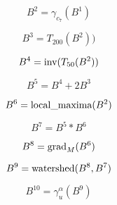\documentclass[\main/main.tex]{subfiles}
\begin{document}
\begin{equation}
    \label{eq:larva:open_1}
    B^2= \gamma_{c_7}(B^1)
\end{equation}

\begin{equation}
    \label{eq:larva:thresh:high}
    B^3= T_{200}(B^2))
\end{equation}

\begin{equation}
    \label{eq:larva:thresh:low}
    B^4= \operatorname{\textnormal{inv}}(T_{50}(B^2))
\end{equation}

\begin{equation}
    \label{eq:larva:zones}
    B^5= B^4 + 2B^3
\end{equation}

\begin{equation}
    \label{eq:larva:max_loc}
    B^6 = \operatorname{\textnormal{local\_maxima}}(B^2)
\end{equation}

\begin{equation}
    \label{eq:larva:seeds}
    B^7= B^5 * B^6
\end{equation}

\begin{equation}
    \label{eq:larva:grad}
    B^8= \operatorname{\textnormal{grad}}_M(B^6)
\end{equation}

\begin{equation}
    \label{eq:larva:water}
    B^9= \operatorname{\textnormal{watershed}}(B^8,B^7)
\end{equation}

\begin{equation}
    \label{eq:larva:down:water}
    B^{10}= \gamma^{\alpha}_{u}(B^9)
\end{equation}
\end{document}
